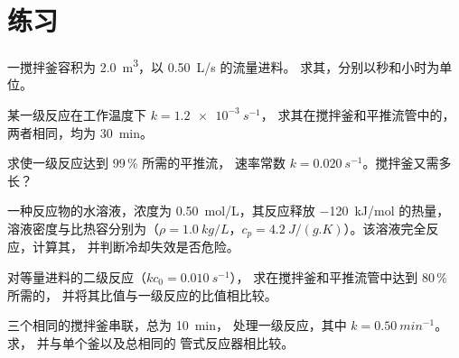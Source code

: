 \section{练习}

\begin{exercise}[$\star$]\label{exo:b2:continuous-reactors:1}
一搅拌釜容积为 \qty{2.0}{m^3}，以 \qty{0.50}{L/s} 的流量进料。
求其，分别以秒和小时为单位。
\end{exercise}

\begin{exercise}[$\star$]\label{exo:b2:continuous-reactors:2}
某一级反应在工作温度下 $k = \qty{1.2e-3}{s^{-1}}$，
求其在搅拌釜和平推流管中的，
两者相同，均为 \qty{30}{min}。
\end{exercise}

\begin{exercise}[$\star$]\label{exo:b2:continuous-reactors:3}
求使一级反应达到 99\,\% 所需的平推流，
速率常数 $k = \qty{0.020}{s^{-1}}$。搅拌釜又需多长？
\end{exercise}

\begin{exercise}[$\star$]\label{exo:b2:continuous-reactors:4}
一种反应物的水溶液，浓度为 \qty{0.50}{mol/L}，其反应释放 \qty{-120}{kJ/mol} 的热量，
溶液密度与比热容分别为（$\rho = \qty{1.0}{kg/L}$，$c_p =
\qty{4.2}{J/(g.K)}$）。该溶液完全反应，计算其，
并判断冷却失效是否危险。
\end{exercise}

\begin{exercise}[$\star\star$]\label{exo:b2:continuous-reactors:5}
对等量进料的二级反应（$kc_0 = \qty{0.010}{s^{-1}}$），
求在搅拌釜和平推流管中达到 80\,\% 所需的，
并将其比值与一级反应的比值相比较。
\end{exercise}

\begin{exercise}[$\star\star$]\label{exo:b2:continuous-reactors:6}
三个相同的搅拌釜串联，总为 \qty{10}{min}，
处理一级反应，其中 $k = \qty{0.50}{min^{-1}}$。求，
并与单个釜以及总相同的
管式反应器相比较。
\end{exercise}


